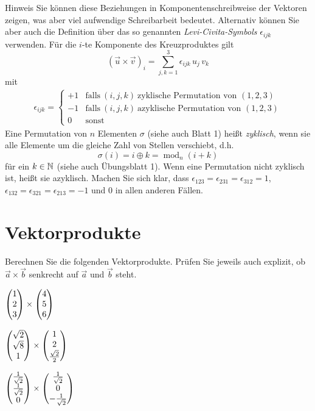 \documentclass{scrartcl}
\begin{document}
\begin{remark}{Hinweis}
  Sie können diese Beziehungen in Komponentenschreibweise der Vektoren zeigen, was aber viel aufwendige Schreibarbeit bedeutet.
  Alternativ können Sie aber auch die Definition über das  so genannten \emph{Levi-Civita-Symbols} $\epsilon_{ijk}$ verwenden.
  Für die $i$-te Komponente des Kreuzproduktes gilt
  \[
    (\vec{u}\times \vec{v})_i = \sum_{j,k =1}^3 \epsilon_{ijk}\, u_j\,v_k
  \]
  mit
  \begin{gather}
    \epsilon_{ijk} =
    \begin{cases}
      +1 &\textrm{falls}\ (i,j,k)\ \textrm{zyklische Permutation von } (1,2,3)\\
      -1 &\textrm{falls}\ (i,j,k)\ \textrm{azyklische Permutation von } (1,2,3)\\
      0 &\textrm{sonst}
    \end{cases}
    \nonumber
  \end{gather}
  Eine Permutation von $n$ Elementen $\sigma$ (siehe auch Blatt 1) heißt \emph{zyklisch}, wenn sie alle Elemente um die gleiche Zahl von Stellen verschiebt, d.h.
  \[
    \sigma(i) = i \oplus k = \operatorname{mod}_n(i + k)
  \]
  für ein $k \in \mathbb{N}$ (siehe auch Übungsblatt 1).
  Wenn eine Permutation nicht zyklisch ist, heißt sie azyklisch.
  Machen Sie sich klar, dass $\epsilon_{123}=\epsilon_{231}=\epsilon_{312}=1$, $\epsilon_{132}=\epsilon_{321}=\epsilon_{213}=-1$ und $0$ in allen anderen Fällen.
\end{remark}


\section{Vektorprodukte } 
Berechnen Sie die folgenden Vektorprodukte.
Prüfen Sie jeweils auch explizit, ob $\vec{a} \times \vec{b}$ senkrecht auf $\vec{a}$ und $\vec{b}$ steht.

\begin{subex*}
  \item $\begin{pmatrix}1 \\ 2 \\ 3\end{pmatrix} \times \begin{pmatrix}4 \\ 5 \\ 6\end{pmatrix}$
  \item $\begin{pmatrix}\sqrt{2} \\ \sqrt{8} \\ 1\end{pmatrix} \times \begin{pmatrix}1 \\ 2 \\ \frac{\sqrt{2}}{2}\end{pmatrix}$
  \item $\begin{pmatrix}\frac{1}{\sqrt{2}} \\ \frac{1}{\sqrt{2}} \\ 0\end{pmatrix} \times \begin{pmatrix}\frac{1}{\sqrt{2}} \\ 0 \\ -\frac{1}{\sqrt{2}}\end{pmatrix}$
\end{subex*}
\end{document}
